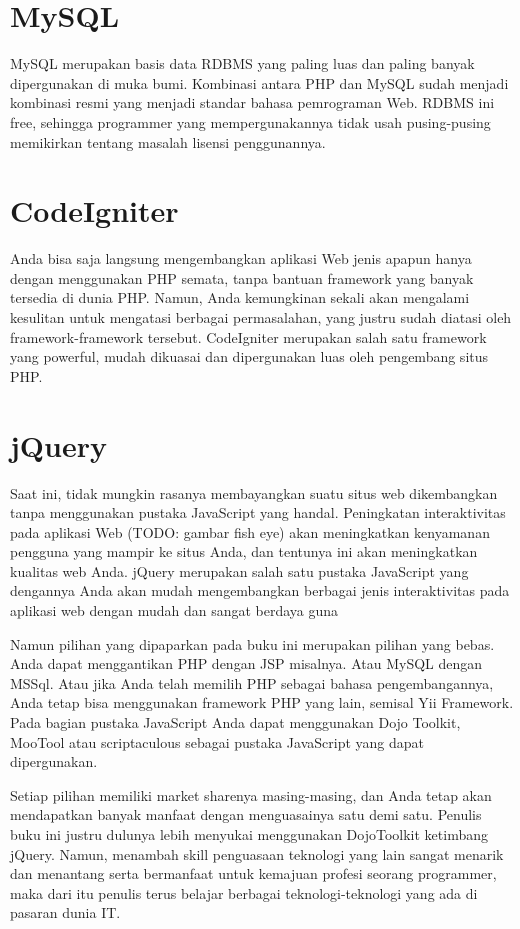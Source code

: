 \section{MySQL}
MySQL merupakan basis data RDBMS yang paling luas dan paling banyak dipergunakan di muka bumi. Kombinasi antara PHP dan MySQL sudah menjadi kombinasi resmi yang menjadi standar bahasa pemrograman Web. RDBMS ini free, sehingga programmer yang mempergunakannya tidak usah pusing-pusing memikirkan tentang masalah lisensi penggunannya.
\section{CodeIgniter}
Anda bisa saja langsung mengembangkan aplikasi Web jenis apapun hanya dengan menggunakan PHP semata, tanpa bantuan framework yang banyak tersedia di dunia PHP. Namun, Anda kemungkinan sekali akan mengalami kesulitan untuk mengatasi berbagai permasalahan, yang justru sudah diatasi oleh framework-framework tersebut. CodeIgniter merupakan salah satu framework yang powerful, mudah dikuasai dan dipergunakan luas oleh pengembang situs PHP.
\section{jQuery}
Saat ini, tidak mungkin rasanya membayangkan suatu situs web dikembangkan tanpa menggunakan pustaka JavaScript yang handal. Peningkatan interaktivitas pada aplikasi Web (TODO: gambar fish eye) akan meningkatkan kenyamanan pengguna yang mampir ke situs Anda, dan tentunya ini akan meningkatkan kualitas web Anda. jQuery merupakan salah satu pustaka JavaScript yang dengannya Anda akan mudah mengembangkan berbagai jenis interaktivitas pada aplikasi web dengan mudah dan sangat berdaya guna

Namun pilihan yang dipaparkan pada buku ini merupakan pilihan yang bebas. Anda dapat menggantikan PHP dengan JSP misalnya. Atau MySQL dengan MSSql. Atau jika Anda telah memilih PHP sebagai bahasa pengembangannya, Anda tetap bisa menggunakan framework PHP yang lain, semisal Yii Framework. Pada bagian pustaka JavaScript Anda dapat menggunakan Dojo Toolkit, MooTool atau scriptaculous sebagai pustaka JavaScript yang dapat dipergunakan.

Setiap pilihan memiliki market sharenya masing-masing, dan Anda tetap akan mendapatkan banyak manfaat dengan menguasainya satu demi satu. Penulis buku ini justru dulunya lebih menyukai menggunakan DojoToolkit ketimbang jQuery. Namun, menambah skill penguasaan teknologi yang lain sangat menarik dan menantang serta bermanfaat untuk kemajuan profesi seorang programmer, maka dari itu penulis terus belajar berbagai teknologi-teknologi yang ada di pasaran dunia IT.
